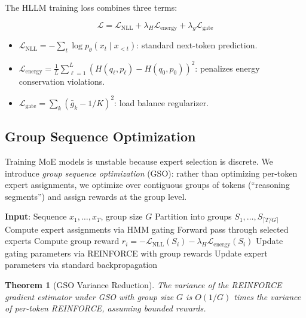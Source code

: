 \documentclass[11pt,letterpaper]{article}
\newtheorem{theorem}{Theorem}[section]
\begin{document}
The HLLM training loss combines three terms:

\begin{equation}
\mathcal{L} = \mathcal{L}_{\text{NLL}} + \lambda_H \mathcal{L}_{\text{energy}} + \lambda_g \mathcal{L}_{\text{gate}}
\label{eq:loss}
\end{equation}

\begin{itemize}
    \item $\mathcal{L}_{\text{NLL}} = -\sum_t \log p_\theta(x_t \mid x_{<t})$: standard next-token prediction.
    \item $\mathcal{L}_{\text{energy}} = \frac{1}{L}\sum_{\ell=1}^{L} (H(q_\ell, p_\ell) - H(q_0, p_0))^2$: penalizes energy conservation violations.
    \item $\mathcal{L}_{\text{gate}} = \sum_k (\bar{g}_k - 1/K)^2$: load balance regularizer.
\end{itemize}

\subsection{Group Sequence Optimization}

Training MoE models is unstable because expert selection is discrete. We introduce \emph{group sequence optimization} (GSO): rather than optimizing per-token expert assignments, we optimize over contiguous groups of tokens (``reasoning segments'') and assign rewards at the group level.

\begin{algorithm}[t]
\caption{Group Sequence Optimization}
\label{alg:gso}
\begin{algorithmic}[1]
\STATE \textbf{Input}: Sequence $x_1, \ldots, x_T$, group size $G$
\STATE Partition into groups $S_1, \ldots, S_{\lceil T/G \rceil}$
    \STATE Compute expert assignments via HMM gating
    \STATE Forward pass through selected experts
    \STATE Compute group reward $r_i = -\mathcal{L}_{\text{NLL}}(S_i) - \lambda_H \mathcal{L}_{\text{energy}}(S_i)$
\ENDFOR
\STATE Update gating parameters via REINFORCE with group rewards
\STATE Update expert parameters via standard backpropagation
\end{algorithmic}
\end{algorithm}

\begin{theorem}[GSO Variance Reduction]
The variance of the REINFORCE gradient estimator under GSO with group size $G$ is $O(1/G)$ times the variance of per-token REINFORCE, assuming bounded rewards.
\end{theorem}
\end{document}
